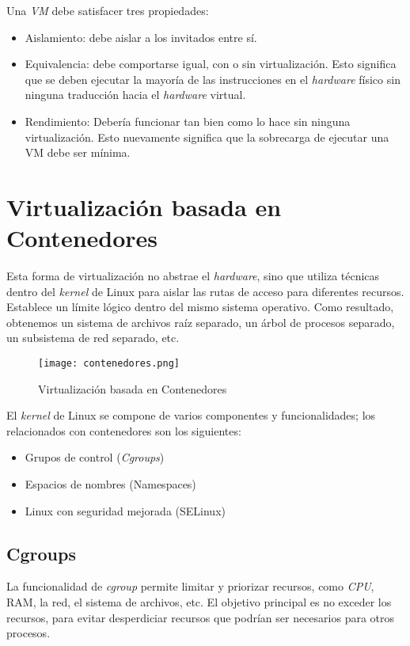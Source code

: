 Una \emph{VM} debe satisfacer tres propiedades:
\begin{itemize}
    \setlength\itemsep{-0.6em}
    \item Aislamiento: debe aislar a los invitados entre sí. 
    \item Equivalencia: debe comportarse igual, con o sin virtualización. Esto 
    significa que se deben ejecutar la mayoría de las instrucciones en el \emph{hardware} 
    físico sin ninguna traducción hacia el \emph{hardware} virtual.
    \item Rendimiento: Debería funcionar tan bien como lo hace sin ninguna 
    virtualización. Esto nuevamente significa que la sobrecarga de ejecutar 
    una VM debe ser mínima.
\end{itemize}

\section{Virtualización basada en Contenedores}

Esta forma de virtualización no abstrae el \emph{hardware}, sino que utiliza técnicas 
dentro del \emph{kernel} de Linux para aislar las rutas de acceso para diferentes recursos. 
Establece un límite lógico dentro del mismo sistema operativo. Como resultado, obtenemos 
un sistema de archivos raíz separado, un árbol de procesos separado, un subsistema 
de red separado, etc.

\begin{center}
    \begin{figure}   
       \begin{center}
          \texttt{[image: contenedores.png]}
       \end{center}
       \caption{Virtualización basada en Contenedores}
    \end{figure}
 \end{center}

El \emph{kernel} de Linux se compone de varios componentes y funcionalidades; los relacionados 
con contenedores son los siguientes:
\begin{itemize}
    \setlength\itemsep{-0.6em}
    \item Grupos de control (\emph{Cgroups})
    \item Espacios de nombres (Namespaces)
    \item Linux con seguridad mejorada (SELinux)
\end{itemize}

\subsection*{Cgroups}
La funcionalidad de \emph{cgroup} permite limitar y priorizar recursos, como \emph{CPU}, RAM, 
la red, el sistema de archivos, etc. El objetivo principal es no exceder los 
recursos, para evitar desperdiciar recursos que podrían ser necesarios para 
otros procesos.


